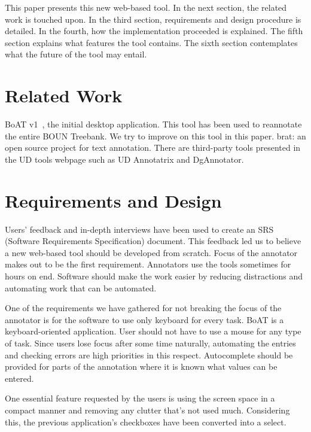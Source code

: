 \documentclass[
]{ceurart}
\begin{document}
This paper presents this new web-based tool.
In the next section, the related work is touched upon.
In the third section, requirements and design procedure is detailed.
In the fourth, how the implementation proceeded is explained.
The fifth section explains what features the tool contains.
The sixth section contemplates what the future of the tool may entail.

\section{Related Work}

BoAT v1~\cite{turk-etal-2019-turkish}, the initial desktop application. 
This tool has been used to reannotate the entire BOUN Treebank.
We try to improve on this tool in this paper.\newline
brat: an open source project for text annotation.\cite{brat}\newline
There are third-party tools presented in the UD tools webpage such as UD Annotatrix\cite{tyers-etal:2018} and DgAnnotator\cite{dgannotator}.

\section{Requirements and Design}

Users' feedback and in-depth interviews have been used to create an SRS (Software Requirements Specification) document.
This feedback led us to believe a new web-based tool should be developed from scratch.
Focus of the annotator makes out to be the first requirement.
Annotators use the tools sometimes for hours on end.
Software should make the work easier by reducing distractions and automating work that can be automated.

One of the requirements we have gathered for not breaking the focus of the annotator is for the software to use only keyboard for every task.
BoAT is a keyboard-oriented application.
User should not have to use a mouse for any type of task.
Since users lose focus after some time naturally, automating the entries and checking errors are high priorities in this respect.
Autocomplete should be provided for parts of the annotation where it is known what values can be entered.

One essential feature requested by the users is using the screen space in a compact manner and removing any clutter that's not used much.
Considering this, the previous application's checkboxes have been converted into a select.
\end{document}
